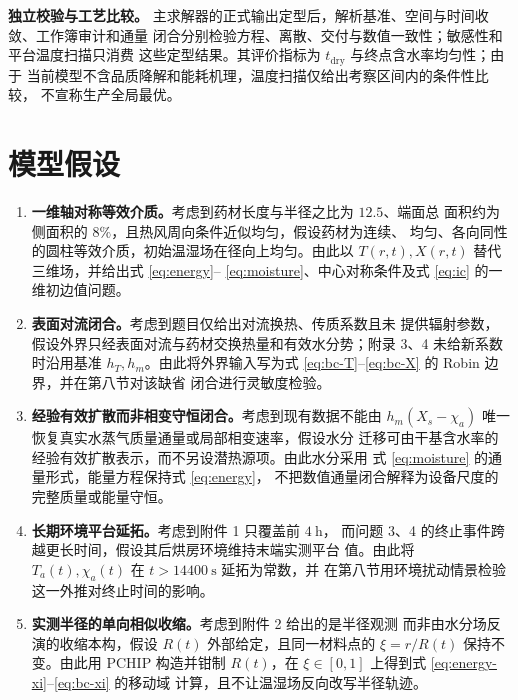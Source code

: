 \documentclass[withoutpreface,bwprint]{cumcmthesis}
\begin{document}
\noindent\textbf{独立校验与工艺比较。}
主求解器的正式输出定型后，解析基准、空间与时间收敛、工作簿审计和通量
闭合分别检验方程、离散、交付与数值一致性；敏感性和平台温度扫描只消费
这些定型结果。其评价指标为 $t_{\mathrm{dry}}$ 与终点含水率均匀性；由于
当前模型不含品质降解和能耗机理，温度扫描仅给出考察区间内的条件性比较，
不宣称生产全局最优。

\section{模型假设}

\begin{enumerate}
  \item \textbf{一维轴对称等效介质。}考虑到药材长度与半径之比为 $12.5$、端面总
  面积约为侧面积的 $8\%$，且热风周向条件近似均匀，假设药材为连续、
  均匀、各向同性的圆柱等效介质，初始温湿场在径向上均匀。由此以
  $T(r,t),X(r,t)$ 替代三维场，并给出式 \eqref{eq:energy}--
  \eqref{eq:moisture}、中心对称条件及式 \eqref{eq:ic} 的一维初边值问题。
  \item \textbf{表面对流闭合。}考虑到题目仅给出对流换热、传质系数且未
  提供辐射参数，假设外界只经表面对流与药材交换热量和有效水分势；附录
  3、4 未给新系数时沿用基准 $h_T,h_m$。由此将外界输入写为式
  \eqref{eq:bc-T}--\eqref{eq:bc-X} 的 Robin 边界，并在第八节对该缺省
  闭合进行灵敏度检验。
  \item \textbf{经验有效扩散而非相变守恒闭合。}考虑到现有数据不能由
  $h_m(X_s-\chi_a)$ 唯一恢复真实水蒸气质量通量或局部相变速率，假设水分
  迁移可由干基含水率的经验有效扩散表示，而不另设潜热源项。由此水分采用
  式 \eqref{eq:moisture} 的通量形式，能量方程保持式 \eqref{eq:energy}，
  不把数值通量闭合解释为设备尺度的完整质量或能量守恒。
  \item \textbf{长期环境平台延拓。}考虑到附件 1 只覆盖前 $4\ \mathrm{h}$，
  而问题 3、4 的终止事件跨越更长时间，假设其后烘房环境维持末端实测平台
  值。由此将 $T_a(t),\chi_a(t)$ 在 $t>14400\ \mathrm{s}$ 延拓为常数，并
  在第八节用环境扰动情景检验这一外推对终止时间的影响。
  \item \textbf{实测半径的单向相似收缩。}考虑到附件 2 给出的是半径观测
  而非由水分场反演的收缩本构，假设 $R(t)$ 外部给定，且同一材料点的
  $\xi=r/R(t)$ 保持不变。由此用 PCHIP 构造并钳制 $R(t)$，在
  $\xi\in[0,1]$ 上得到式 \eqref{eq:energy-xi}--\eqref{eq:bc-xi} 的移动域
  计算，且不让温湿场反向改写半径轨迹。
\end{enumerate}

\end{document}
